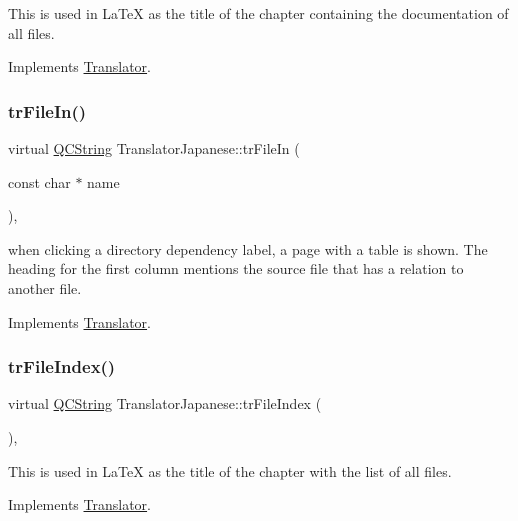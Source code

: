 This is used in La\+TeX as the title of the chapter containing the documentation of all files. 

Implements \mbox{\hyperlink{class_translator}{Translator}}.

\mbox{\label{class_translator_japanese_a0b4f3f23c0d955ab3d49639a0781d429}} 
\subsubsection{\texorpdfstring{trFileIn()}{trFileIn()}}
{\footnotesize\ttfamily virtual \mbox{\hyperlink{class_q_c_string}{Q\+C\+String}} Translator\+Japanese\+::tr\+File\+In (\begin{DoxyParamCaption}\item[{const char $\ast$}]{name }\end{DoxyParamCaption})\hspace{0.3cm}{\ttfamily [inline]}, {\ttfamily [virtual]}}

when clicking a directory dependency label, a page with a table is shown. The heading for the first column mentions the source file that has a relation to another file. 

Implements \mbox{\hyperlink{class_translator}{Translator}}.

\mbox{\label{class_translator_japanese_a744e9944d8d0ba02c581a720fe5e3ea3}} 
\subsubsection{\texorpdfstring{trFileIndex()}{trFileIndex()}}
{\footnotesize\ttfamily virtual \mbox{\hyperlink{class_q_c_string}{Q\+C\+String}} Translator\+Japanese\+::tr\+File\+Index (\begin{DoxyParamCaption}{ }\end{DoxyParamCaption})\hspace{0.3cm}{\ttfamily [inline]}, {\ttfamily [virtual]}}

This is used in La\+TeX as the title of the chapter with the list of all files. 

Implements \mbox{\hyperlink{class_translator}{Translator}}.

